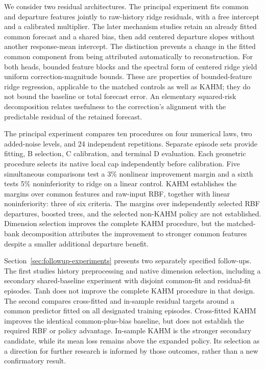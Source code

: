 We consider two residual architectures. The principal experiment fits
common and departure features jointly to raw-history ridge residuals,
with a free intercept and a calibrated multiplier. The later mechanism
studies retain an already fitted common forecast and a shared bias, then
add centered departure slopes without another response-mean intercept.
The distinction prevents a change in the fitted common component from
being attributed automatically to reconstruction. For both heads,
bounded feature blocks and the spectral form of centered ridge yield
uniform correction-magnitude bounds. These are properties of
bounded-feature ridge regression, applicable to the matched controls
as well as KAHM; they do not bound the baseline or total forecast error.
An elementary squared-risk decomposition relates usefulness to the
correction's alignment with the predictable residual of the retained
forecast.

The principal experiment compares ten procedures on four numerical
laws, two added-noise levels, and 24 independent repetitions. Separate
episode sets provide fitting, B selection, C calibration, and terminal
D evaluation. Each geometric procedure selects its native local cap
independently before calibration. Five simultaneous comparisons test a
3\% nonlinear improvement margin and a sixth tests 5\% noninferiority
to ridge on a linear control. KAHM establishes the margins over common
features and raw-input RBF, together with linear noninferiority: three
of six criteria. The margins over independently selected RBF departures,
boosted trees, and the selected non-KAHM policy are not established.
Dimension selection improves the complete KAHM procedure, but the
matched-bank decomposition attributes the improvement to stronger
common features despite a smaller additional departure benefit.

Section~\ref{sec:followup-experiments} presents two separately specified
follow-ups. The first studies history preprocessing and native dimension
selection, including a secondary shared-baseline experiment with
disjoint common-fit and residual-fit episodes. Tanh does not improve the
complete KAHM procedure in that design. The second compares cross-fitted
and in-sample residual targets around a common predictor fitted on all
designated training episodes. Cross-fitted KAHM improves the identical
common-plus-bias baseline, but does not establish the required RBF or
policy advantage. In-sample KAHM is the stronger secondary candidate,
while its mean loss remains above the expanded policy. Its selection
as a direction for further research is informed by those outcomes,
rather than a new confirmatory result.

